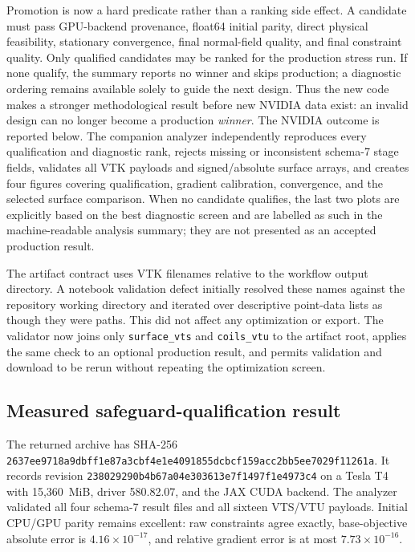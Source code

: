 \documentclass[11pt,a4paper]{article}
\newcommand{\code}[1]{\texttt{#1}}
\begin{document}
Promotion is now a hard predicate rather than a ranking side effect.  A
candidate must pass GPU-backend provenance, float64 initial parity, direct
physical feasibility, stationary convergence, final normal-field quality, and
final constraint quality.  Only qualified candidates may be ranked for the
production stress run.  If none qualify, the summary reports no winner and
skips production; a diagnostic ordering remains available solely to guide the
next design.  Thus the new code makes a stronger methodological result before
new NVIDIA data exist: an invalid design can no longer become a production
\emph{winner}.  The NVIDIA outcome is reported below.
The companion analyzer independently reproduces every qualification and
diagnostic rank, rejects missing or inconsistent schema-7 stage fields,
validates all VTK payloads and signed/absolute surface arrays, and creates four
figures covering qualification, gradient calibration, convergence, and the
selected surface comparison.  When no candidate qualifies, the last two plots
are explicitly based on the best diagnostic screen and are labelled as such in
the machine-readable analysis summary; they are not presented as an accepted
production result.

The artifact contract uses VTK filenames relative to the workflow output
directory.  A notebook validation defect initially resolved these names
against the repository working directory and iterated over descriptive
point-data lists as though they were paths.  This did not affect any
optimization or export.  The validator now joins only \code{surface\_vts} and
\code{coils\_vtu} to the artifact root, applies the same check to an optional
production result, and permits validation and download to be rerun without
repeating the optimization screen.

\subsection{Measured safeguard-qualification result}

The returned archive has SHA-256
\code{2637ee9718a9dbff1e87a3cbf4e1e4091855dcbcf159acc2bb5ee7029f11261a}.
It records revision \code{238029290b4b67a04e303613e7f1497f1e4973c4} on a
Tesla T4 with 15,360~MiB, driver 580.82.07, and the JAX CUDA backend.  The
analyzer validated all four schema-7 result files and all sixteen VTS/VTU
payloads.  Initial CPU/GPU parity remains excellent: raw constraints agree
exactly, base-objective absolute error is $4.16\times10^{-17}$, and relative
gradient error is at most $7.73\times10^{-16}$.
\end{document}
